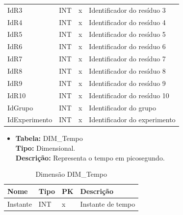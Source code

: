 \begin{table}[!htbp]
\begin{tabular}{@{}llll@{}}
	IdR3 				     & INT        &  x          & Identificador do resíduo 3   	\\
	IdR4 				     & INT        &  x          & Identificador do resíduo 4   	\\
	IdR5 				     & INT        &  x          & Identificador do resíduo 5   	\\
	IdR6 				     & INT        &  x          & Identificador do resíduo 6   	\\
	IdR7 				     & INT        &  x          & Identificador do resíduo 7   	\\
	IdR8 				     & INT        &  x          & Identificador do resíduo 8   	\\
	IdR9 				     & INT        &  x          & Identificador do resíduo 9   	\\
	IdR10			 	     & INT        &  x          & Identificador do resíduo 10  	\\	
	IdGrupo			 	     & INT        &  x          & Identificador do grupo  		\\	
	IdExperimento 			 & INT        &  x          & Identificador do experimento 	\\ \bottomrule
	\end{tabular}
\end{table}

\begin{itemize}
	\item
		\textbf{Tabela:} DIM\_Tempo \\
		\textbf{Tipo:} Dimensional. \\
		\textbf{Descrição:} Representa o tempo em picosegundo. \\
\end{itemize}
\begin{table}[h]
	\caption{Dimensão DIM\_Tempo}
	\centering
	\begin{tabular}{@{}llll@{}}
	\toprule
	\textbf{Nome} 	& \textbf{Tipo} & \textbf{PK} & \textbf{Descrição}           		\\ \midrule			
	Instante 		& INT 	       &  x           & Instante de tempo 					\\ \bottomrule
	\end{tabular}
\end{table}

